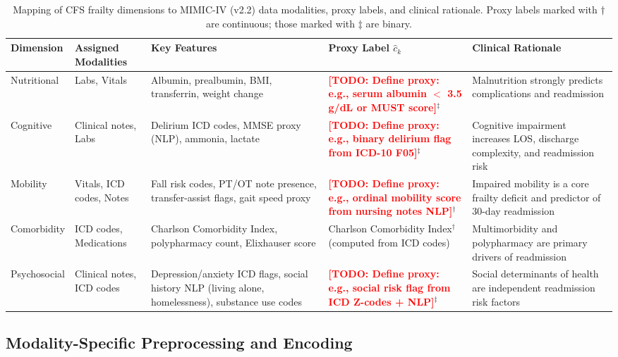 \documentclass[review,12pt,authoryear]{elsarticle}
\newcommand{\todo}[1]{\textcolor{red}{\textbf{[TODO: #1]}}}
\newcommand{\dataset}{MIMIC-IV (v2.2)}
\begin{document}
\begin{table}[t]
  \centering
  \caption{Mapping of CFS frailty dimensions to \dataset{} data modalities, proxy labels, and clinical rationale.
  Proxy labels marked with $\dagger$ are continuous; those marked with $\ddagger$ are binary.}
  \label{tab:concept_mapping}
  \begin{tabularx}{\textwidth}{lXXXX}
    \toprule
    \textbf{Dimension} & \textbf{Assigned Modalities} & \textbf{Key Features} & \textbf{Proxy Label $\hat{c}_k$} & \textbf{Clinical Rationale} \\
    \midrule
    Nutritional  & Labs, Vitals
      & Albumin, prealbumin, BMI, transferrin, weight change
      & \todo{Define proxy: e.g., serum albumin $<$ 3.5 g/dL or MUST score}$^\ddagger$
      & Malnutrition strongly predicts complications and readmission \citep{segal2019frailty} \\[4pt]
    Cognitive    & Clinical notes, Labs
      & Delirium ICD codes, MMSE proxy (NLP), ammonia, lactate
      & \todo{Define proxy: e.g., binary delirium flag from ICD-10 F05}$^\ddagger$
      & Cognitive impairment increases LOS, discharge complexity, and readmission risk \\[4pt]
    Mobility     & Vitals, ICD codes, Notes
      & Fall risk codes, PT/OT note presence, transfer-assist flags, gait speed proxy
      & \todo{Define proxy: e.g., ordinal mobility score from nursing notes NLP}$^\dagger$
      & Impaired mobility is a core frailty deficit and predictor of 30-day readmission \\[4pt]
    Comorbidity  & ICD codes, Medications
      & Charlson Comorbidity Index, polypharmacy count, Elixhauser score
      & Charlson Comorbidity Index$^\dagger$ (computed from ICD codes)
      & Multimorbidity and polypharmacy are primary drivers of readmission \citep{stow2019predicting} \\[4pt]
    Psychosocial & Clinical notes, ICD codes
      & Depression/anxiety ICD flags, social history NLP (living alone, homelessness), substance use codes
      & \todo{Define proxy: e.g., social risk flag from ICD Z-codes + NLP}$^\ddagger$
      & Social determinants of health are independent readmission risk factors \\
    \bottomrule
  \end{tabularx}
\end{table}

\subsection{Modality-Specific Preprocessing and Encoding}
\label{subsec:preprocessing}
\end{document}

